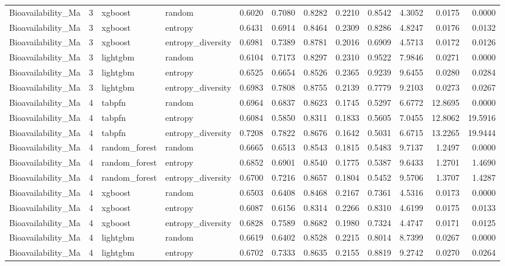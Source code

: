 \begin{tabular}{lrllrrrrrrrr}
Bioavailability_Ma & 3 & xgboost & random & 0.6020 & 0.7080 & 0.8282 & 0.2210 & 0.8542 & 4.3052 & 0.0175 & 0.0000 \\
Bioavailability_Ma & 3 & xgboost & entropy & 0.6431 & 0.6914 & 0.8464 & 0.2309 & 0.8286 & 4.8247 & 0.0176 & 0.0132 \\
Bioavailability_Ma & 3 & xgboost & entropy_diversity & 0.6981 & 0.7389 & 0.8781 & 0.2016 & 0.6909 & 4.5713 & 0.0172 & 0.0126 \\
Bioavailability_Ma & 3 & lightgbm & random & 0.6104 & 0.7173 & 0.8297 & 0.2310 & 0.9522 & 7.9846 & 0.0271 & 0.0000 \\
Bioavailability_Ma & 3 & lightgbm & entropy & 0.6525 & 0.6654 & 0.8526 & 0.2365 & 0.9239 & 9.6455 & 0.0280 & 0.0284 \\
Bioavailability_Ma & 3 & lightgbm & entropy_diversity & 0.6983 & 0.7808 & 0.8755 & 0.2139 & 0.7779 & 9.2103 & 0.0273 & 0.0267 \\
Bioavailability_Ma & 4 & tabpfn & random & 0.6964 & 0.6837 & 0.8623 & 0.1745 & 0.5297 & 6.6772 & 12.8695 & 0.0000 \\
Bioavailability_Ma & 4 & tabpfn & entropy & 0.6084 & 0.5850 & 0.8311 & 0.1833 & 0.5605 & 7.0455 & 12.8062 & 19.5916 \\
Bioavailability_Ma & 4 & tabpfn & entropy_diversity & 0.7208 & 0.7822 & 0.8676 & 0.1642 & 0.5031 & 6.6715 & 13.2265 & 19.9444 \\
Bioavailability_Ma & 4 & random_forest & random & 0.6665 & 0.6513 & 0.8543 & 0.1815 & 0.5483 & 9.7137 & 1.2497 & 0.0000 \\
Bioavailability_Ma & 4 & random_forest & entropy & 0.6852 & 0.6901 & 0.8540 & 0.1775 & 0.5387 & 9.6433 & 1.2701 & 1.4690 \\
Bioavailability_Ma & 4 & random_forest & entropy_diversity & 0.6700 & 0.7216 & 0.8657 & 0.1804 & 0.5452 & 9.5706 & 1.3707 & 1.4287 \\
Bioavailability_Ma & 4 & xgboost & random & 0.6503 & 0.6408 & 0.8468 & 0.2167 & 0.7361 & 4.5316 & 0.0173 & 0.0000 \\
Bioavailability_Ma & 4 & xgboost & entropy & 0.6087 & 0.6156 & 0.8314 & 0.2266 & 0.8310 & 4.6199 & 0.0175 & 0.0133 \\
Bioavailability_Ma & 4 & xgboost & entropy_diversity & 0.6828 & 0.7589 & 0.8682 & 0.1980 & 0.7324 & 4.4747 & 0.0171 & 0.0125 \\
Bioavailability_Ma & 4 & lightgbm & random & 0.6619 & 0.6402 & 0.8528 & 0.2215 & 0.8014 & 8.7399 & 0.0267 & 0.0000 \\
Bioavailability_Ma & 4 & lightgbm & entropy & 0.6702 & 0.7333 & 0.8635 & 0.2155 & 0.8819 & 9.2742 & 0.0270 & 0.0264 \\

\end{tabular}
